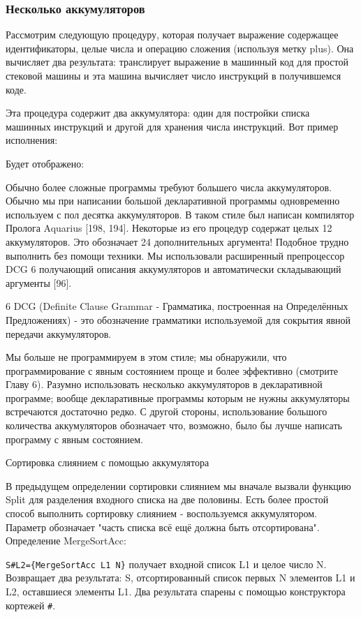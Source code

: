 \subsubsection{Несколько аккумуляторов}

Рассмотрим следующую процедуру, которая получает выражение содержащее идентификаторы, целые числа и операцию сложения (используя метку plus). Она вычисляет два результата: транслирует выражение в машинный код для простой стековой машины и эта машина вычисляет число инструкций в получившемся коде.

Эта процедура содержит два аккумулятора: один для постройки списка машинных инструкций и другой для хранения числа инструкций. Вот пример исполнения:

Будет отображено:

Обычно более сложные программы требуют большего числа аккумуляторов. Обычно мы при написании большой декларативной программы одновременно используем с пол десятка аккумуляторов. В таком стиле был написан компилятор Пролога Aquarius [198, 194]. Некоторые из его процедур содержат целых 12 аккумуляторов. Это обозначает 24 дополнительных аргумента! Подобное трудно выполнить без помощи техники. Мы использовали расширенный препроцессор DCG 6 получающий описания аккумуляторов и автоматически складывающий аргументы [96].

6 DCG (Definite Clause Grammar - Грамматика, построенная на Определённых Предложениях) - это обозначение грамматики используемой для сокрытия явной передачи аккумуляторов.

Мы больше не программируем в этом стиле; мы обнаружили, что программирование с явным состоянием проще и более эффективно (смотрите Главу 6). Разумно использовать несколько аккумуляторов в декларативной программе; вообще декларативные программы которым не нужны аккумуляторы встречаются достаточно редко. С другой стороны, использование большого количества аккумуляторов обозначает что, возможно, было бы лучше написать программу с явным состоянием.

Сортировка слиянием с помощью аккумулятора

В предыдущем определении сортировки слиянием мы вначале вызвали функцию Split для разделения входного списка на две половины. Есть более простой способ выполнить сортировку слиянием - воспользуемся аккумулятором. Параметр обозначает "часть списка всё ещё должна быть отсортирована". Определение MergeSortAcc:

\verb|S#L2={MergeSortAcc L1 N}| получает входной список L1 и целое число N. Возвращает два результата: S, отсортированный список первых N элементов L1 и L2, оставшиеся элементы L1. Два результата спарены с помощью конструктора кортежей \verb|#|.

